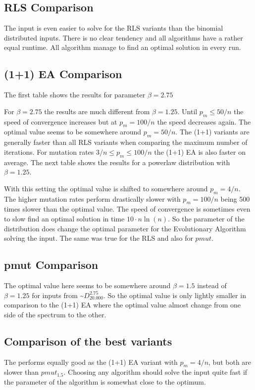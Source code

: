 \subsection{RLS Comparison}


The input is even easier to solve for the RLS variants than the binomial distributed inputs.
There is no clear tendency and all algorithms have a rather equal runtime.
All algorithm manage to find an optimal solution in every run.
\subsection{(1+1) EA Comparison}
The first table shows the results for parameter $\beta=2.75$



For $\beta=2.75$ the results are much different from $\beta=1.25$.
Until $p_m\le50/n$ the speed of convergence increases but at $p_m=100/n$ the speed decreases again.
The optimal value seems to be somewhere around $p_m=50/n$.
The (1+1) variants are generally faster than all RLS variants when comparing the maximum number of iterations.
For mutation rates $3/n\le p_m \le 100/n$ the (1+1) EA is also faster on average.
The next table shows the results for a powerlaw distribution with $\beta=1.25$.



With this setting the optimal value is shifted to somewhere around $p_m=4/n$.
The higher mutation rates perform drastically slower with $p_m=100/n$ being 500 times slower than the optimal value.
The speed of convergence is sometimes even to slow find an optimal solution in time $10\cdot n\ln(n)$.
So the parameter of the distribution does change the optimal parameter for the Evolutionary Algorithm solving the input.
The same was true for the RLS and also for $pmut$.
\subsection{pmut Comparison}


The optimal value here seems to be somewhere around $\beta=1.5$ instead of $\beta =1.25$ for inputs from \textasciitilde$D^{2.75}_{20.000}$. 
So the optimal value is only lightly smaller in comparison to the (1+1) EA where the optimal value almost change from one side of the spectrum to the other.

\subsection{Comparison of the best variants}
The \RLSR[4] performs equally good as the (1+1) EA variant with $p_m=4/n$, but both are slower than $pmut_{1.5}$.
Choosing any algorithm should solve the input quite fast if the parameter of the algorithm is somewhat close to the optimum.

